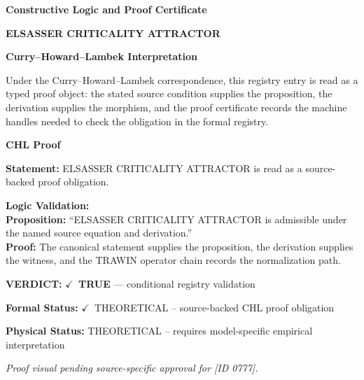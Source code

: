 \clearpage
\begingroup\tzpsupportsetup
\noindent\textbf{\fontsize{10.8pt}{12.8pt}\selectfont [ID 0777] Constructive Logic and Proof Certificate}\par
\noindent\textbf{\fontsize{10pt}{12pt}\selectfont ELSASSER CRITICALITY ATTRACTOR}\par
\vspace{0.45em}
\begingroup
\footnotesize
\setlength{\parskip}{0.22em}
\setlength{\parindent}{0pt}
\noindent\textbf{Curry--Howard--Lambek Interpretation}\par
Under the Curry--Howard--Lambek correspondence, this registry entry is read as a typed proof
object: the stated source condition supplies the proposition, the derivation supplies the
morphism, and the proof certificate records the machine handles needed to check the obligation
in the formal registry.

\vspace{0.45em}
\noindent\textbf{CHL Proof}\par
\textbf{Statement:} ELSASSER CRITICALITY ATTRACTOR is read as a source-backed proof obligation.

\textbf{Logic Validation:}\\
\textbf{Proposition:} ``ELSASSER CRITICALITY ATTRACTOR is admissible under the named source equation and derivation.''\\
\textbf{Proof:} The canonical statement supplies the proposition, the derivation supplies the witness, and the TRAWIN operator chain records the normalization path.

\textbf{VERDICT:} \ensuremath{\checkmark}\ \textbf{TRUE} --- conditional registry validation

\textbf{Formal Status:} \ensuremath{\checkmark}\ THEORETICAL -- source-backed CHL proof obligation

\textbf{Physical Status:} THEORETICAL -- requires model-specific empirical interpretation
\par\vspace{0.45em}
\par
\vfill
\begingroup\footnotesize\itshape
Proof visual pending source-specific approval for [ID 0777].
\par\endgroup
\vfill
\endgroup
\endgroup
